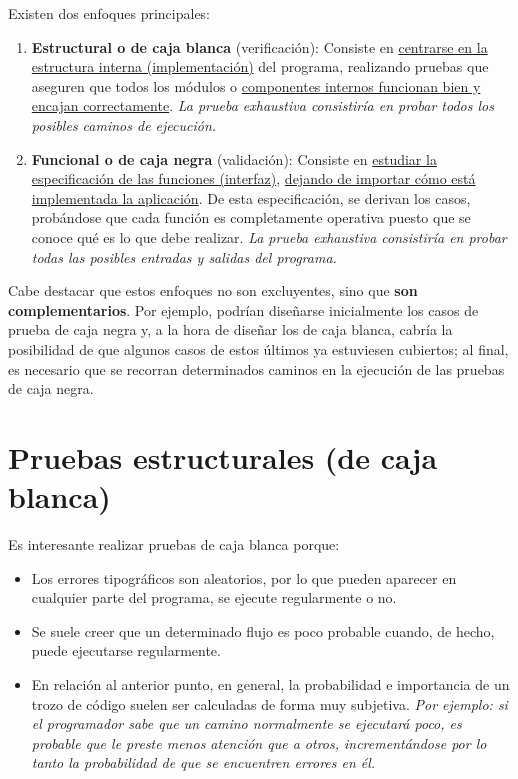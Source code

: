 Existen dos enfoques principales:

\begin{enumerate}
    \item \textbf{Estructural o de caja blanca} (verificación): Consiste en \uline{centrarse en la estructura interna (implementación)} del programa, realizando pruebas que aseguren que todos los módulos o \uline{componentes internos funcionan bien y encajan correctamente}. \textit{La prueba exhaustiva consistiría en probar todos los posibles caminos de ejecución.}
    \item \textbf{Funcional o de caja negra} (validación): Consiste en \uline{estudiar la especificación de las funciones (interfaz)}, \uline{dejando de importar cómo está implementada la aplicación}. De esta especificación, se derivan los casos, probándose que cada función es completamente operativa puesto que se conoce qué es lo que debe realizar. \textit{La prueba exhaustiva consistiría en probar todas las posibles entradas y salidas del programa.}
\end{enumerate}

Cabe destacar que estos enfoques no son excluyentes, sino que \textbf{son complementarios}. Por ejemplo, podrían diseñarse inicialmente los casos de prueba de caja negra y, a la hora de diseñar los de caja blanca, cabría la posibilidad de que algunos casos de estos últimos ya estuviesen cubiertos; al final, es necesario que se recorran determinados caminos en la ejecución de las pruebas de caja negra.


\section{Pruebas estructurales (de caja blanca)}

Es interesante realizar pruebas de caja blanca porque:

\begin{itemize}
    \item Los errores tipográficos son aleatorios, por lo que pueden aparecer en cualquier parte del programa, se ejecute regularmente o no.
    \item Se suele creer que un determinado flujo es poco probable cuando, de hecho, puede ejecutarse regularmente.
    \item En relación al anterior punto, en general, la probabilidad e importancia de un trozo de código suelen ser calculadas de forma muy subjetiva. \textit{Por ejemplo: si el programador sabe que un camino normalmente se ejecutará poco, es probable que le preste menos atención que a otros, incrementándose por lo tanto la probabilidad de que se encuentren errores en él.}
\end{itemize}

